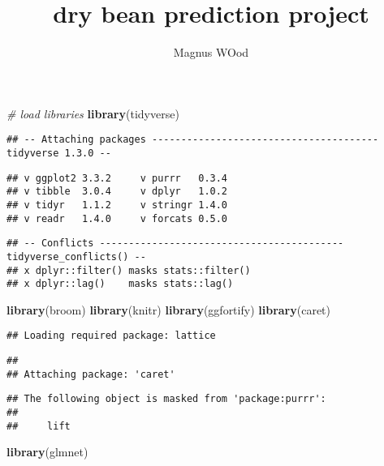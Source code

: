 \documentclass[
]{article}
\title{dry bean prediction project}
\author{Magnus WOod}
\date{}
\newenvironment{Shaded}{\begin{snugshade}}{\end{snugshade}}
\newcommand{\CommentTok}[1]{\textcolor[rgb]{0.56,0.35,0.01}{\textit{#1}}}
\newcommand{\KeywordTok}[1]{\textcolor[rgb]{0.13,0.29,0.53}{\textbf{#1}}}
\newcommand{\NormalTok}[1]{#1}
\begin{document}
\maketitle

\begin{Shaded}
\begin{Highlighting}[]
\CommentTok{# load libraries}
\KeywordTok{library}\NormalTok{(tidyverse)}
\end{Highlighting}
\end{Shaded}

\begin{verbatim}
## -- Attaching packages --------------------------------------- tidyverse 1.3.0 --
\end{verbatim}

\begin{verbatim}
## v ggplot2 3.3.2     v purrr   0.3.4
## v tibble  3.0.4     v dplyr   1.0.2
## v tidyr   1.1.2     v stringr 1.4.0
## v readr   1.4.0     v forcats 0.5.0
\end{verbatim}

\begin{verbatim}
## -- Conflicts ------------------------------------------ tidyverse_conflicts() --
## x dplyr::filter() masks stats::filter()
## x dplyr::lag()    masks stats::lag()
\end{verbatim}

\begin{Shaded}
\begin{Highlighting}[]
\KeywordTok{library}\NormalTok{(broom)}
\KeywordTok{library}\NormalTok{(knitr)}
\KeywordTok{library}\NormalTok{(ggfortify)}
\KeywordTok{library}\NormalTok{(caret)}
\end{Highlighting}
\end{Shaded}

\begin{verbatim}
## Loading required package: lattice
\end{verbatim}

\begin{verbatim}
## 
## Attaching package: 'caret'
\end{verbatim}

\begin{verbatim}
## The following object is masked from 'package:purrr':
## 
##     lift
\end{verbatim}

\begin{Shaded}
\begin{Highlighting}[]
\KeywordTok{library}\NormalTok{(glmnet)}
\end{Highlighting}
\end{Shaded}
\end{document}
